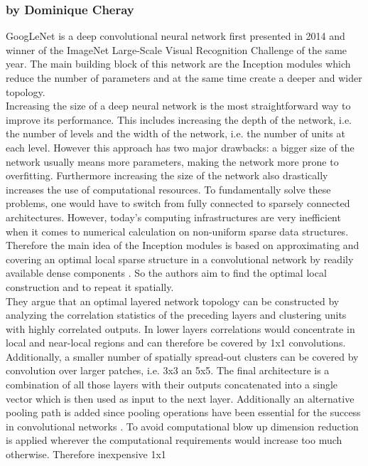 \documentclass[11pt]{report}
\begin{document}
\subsubsection{by Dominique Cheray}
GoogLeNet is a deep convolutional neural network first presented in 2014 and
winner of the ImageNet Large-Scale Visual Recognition Challenge of the same
year. The main building block of this network are the Inception modules which
reduce the number of parameters and at the same time create a deeper and wider
topology. \\
Increasing the size of a deep neural network is the most straightforward way to
improve its performance. This includes increasing the depth of the network, i.e.
the number of levels and the width of the network, i.e. the number of units at
each level. However this approach has two major drawbacks: a bigger size of the
network usually means more parameters, making the network more prone to
overfitting. Furthermore increasing the size of the network also drastically
increases the use of computational resources. To fundamentally solve these
problems, one would have to switch from fully connected to sparsely connected
architectures. However, today's computing infrastructures are very inefficient
when it comes to numerical calculation on non-uniform sparse data structures.
Therefore the main idea of the Inception modules is based on approximating and covering an
optimal local sparse structure in a convolutional network by readily available dense
components \cite{szegedy2015going}. So the authors aim to find the optimal local
construction and to repeat it spatially. \\
They argue that an optimal layered network topology can be constructed by analyzing the
correlation statistics of the preceding layers and clustering units with highly
correlated outputs. In lower layers correlations would concentrate in local and
near-local regions and can therefore be covered by 1x1 convolutions.
Additionally, a smaller number of spatially spread-out clusters can be covered
by convolution over larger patches, i.e. 3x3 an 5x5. The final architecture is a
combination of all those layers with their outputs concatenated into a single
vector which is then used as input to the next layer. Additionally an
alternative pooling path is added since pooling operations have been essential
for the success in convolutional networks \cite{szegedy2015going}. To avoid
computational blow up dimension reduction is applied wherever the computational
requirements would increase too much otherwise. Therefore inexpensive 1x1
\end{document}
